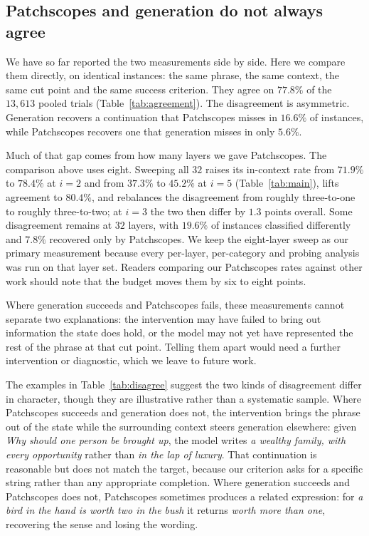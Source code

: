 \subsection{Patchscopes and generation do not always agree}
\label{sec:disagreement}





We have so far reported the two measurements side by side. Here we compare them
directly, on identical instances: the same phrase, the same context, the same
cut point and the same success criterion. They agree on $77.8\%$ of the
$13{,}613$ pooled trials (Table~\ref{tab:agreement}). The disagreement is
asymmetric. Generation recovers a continuation that Patchscopes misses in
$16.6\%$ of instances, while Patchscopes recovers one that generation misses in
only $5.6\%$.

Much of that gap comes from how many layers we gave Patchscopes. The comparison
above uses eight. Sweeping all $32$ raises its in-context rate from $71.9\%$ to
$78.4\%$ at $i=2$ and from $37.3\%$ to $45.2\%$ at $i=5$
(Table~\ref{tab:main}), lifts agreement to $80.4\%$, and rebalances the
disagreement from roughly three-to-one to roughly three-to-two; at $i=3$ the
two then differ by $1.3$ points overall. Some disagreement remains at $32$
layers, with $19.6\%$ of instances classified differently and $7.8\%$ recovered
only by Patchscopes. We keep the eight-layer sweep as our primary measurement
because every per-layer, per-category and probing analysis was run on that
layer set. Readers comparing our Patchscopes rates against other work should
note that the budget moves them by six to eight points.

Where generation succeeds and Patchscopes fails, these measurements cannot
separate two explanations: the intervention may have failed to bring out
information the state does hold, or the model may not yet have represented the
rest of the phrase at that cut point. Telling them apart would need a further
intervention or diagnostic, which we leave to future work.

The examples in Table~\ref{tab:disagree} suggest the two kinds of disagreement
differ in character, though they are illustrative rather than a systematic
sample. Where Patchscopes succeeds and generation does not, the intervention
brings the phrase out of the state while the surrounding context steers
generation elsewhere: given \textit{Why should one person be brought up}, the
model writes \textit{a wealthy family, with every opportunity} rather than
\textit{in the lap of luxury}. That continuation is reasonable but does not
match the target, because our criterion asks for a specific string rather than
any appropriate completion. Where generation succeeds and Patchscopes does not,
Patchscopes sometimes produces a related expression: for \textit{a bird in the
hand is worth two in the bush} it returns \textit{worth more than one},
recovering the sense and losing the wording.

